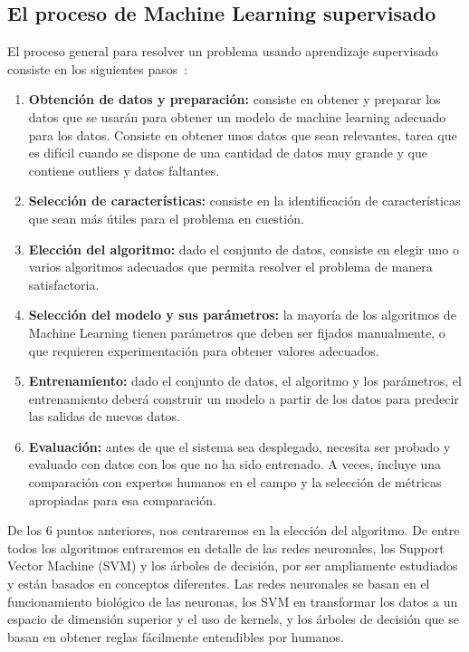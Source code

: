 \subsection{El proceso de Machine Learning supervisado}

El proceso general para resolver un problema usando aprendizaje supervisado consiste en los siguientes pasos~\cite{Marsland:2009:MLA:1571643}:

\begin{enumerate}
	\item \textbf{Obtención de datos y preparación:} consiste en obtener y preparar los datos que se usarán para obtener un modelo de machine learning adecuado para los datos. Consiste en obtener unos datos que sean relevantes, tarea que es difícil cuando se dispone de una cantidad de datos muy grande y que contiene outliers y datos faltantes.
	
	\item \textbf{Selección de características:} consiste en la identificación de características que sean más útiles para el problema en cuestión.
	
	\item \textbf{Elección del algoritmo:} dado el conjunto de datos, consiste en elegir uno o varios algoritmos adecuados que permita resolver el problema de manera satisfactoria.
	
	\item \textbf{Selección del modelo y sus parámetros:} la mayoría de los algoritmos de Machine Learning tienen parámetros que deben ser fijados manualmente, o que requieren experimentación para obtener valores adecuados.
	
	\item \textbf{Entrenamiento:} dado el conjunto de datos, el algoritmo y los parámetros, el entrenamiento deberá construir un modelo a partir de los datos para predecir las salidas de nuevos datos.
	
	\item \textbf{Evaluación:} antes de que el sistema sea desplegado, necesita ser probado y evaluado con datos con los que no ha sido entrenado. A veces, incluye una comparación con expertos humanos en el campo y la selección de métricas apropiadas para esa comparación.    
\end{enumerate}

De los 6 puntos anteriores, nos centraremos en la elección del algoritmo. De entre todos los algoritmos entraremos en detalle de las redes neuronales, los Support Vector Machine (SVM) y los árboles de decisión, por ser ampliamente estudiados y están basados en conceptos diferentes. Las redes neuronales se basan en el funcionamiento biológico de las neuronas, los SVM en transformar los datos a un espacio de dimensión superior y el uso de kernels, y los árboles de decisión que se basan en obtener reglas fácilmente entendibles por humanos.

